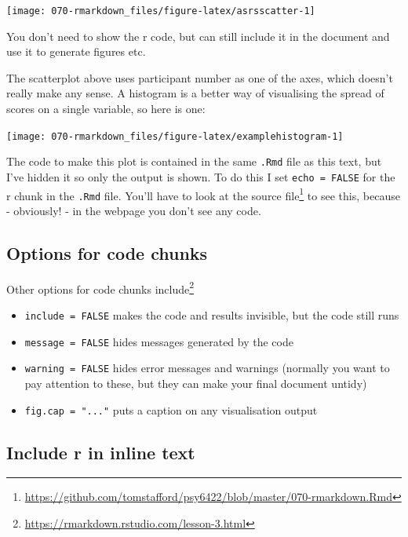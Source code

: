\documentclass[
  12pt,
  a5paper,
]{book}
\DeclareRobustCommand{\href}[2]{#2\footnote{\url{#1}}}
\providecommand{\tightlist}{%
  \setlength{\itemsep}{0pt}\setlength{\parskip}{0pt}}
\begin{document}
\begin{center}\texttt{[image: 070-rmarkdown\_files/figure-latex/asrsscatter-1]} \end{center}

You don't need to show the r code, but can still include it in the document and use it to generate figures etc.

The scatterplot above uses participant number as one of the axes, which doesn't really make any sense. A histogram is a better way of visualising the spread of scores on a single variable, so here is one:

\begin{center}\texttt{[image: 070-rmarkdown\_files/figure-latex/examplehistogram-1]} \end{center}

The code to make this plot is contained in the same \texttt{.Rmd} file as this text, but I've hidden it so only the output is shown. To do this I set \texttt{echo\ =\ FALSE} for the r chunk in the \texttt{.Rmd} file. You'll have to look at the \href{https://github.com/tomstafford/psy6422/blob/master/070-rmarkdown.Rmd}{source file} to see this, because - obviously! - in the webpage you don't see any code.

\hypertarget{options-for-code-chunks}{%
\subsection{Options for code chunks}\label{options-for-code-chunks}}

Other \href{https://rmarkdown.rstudio.com/lesson-3.html}{options for code chunks include}

\begin{itemize}
\tightlist
\item
  \texttt{include\ =\ FALSE} makes the code and results invisible, but the code still runs
\item
  \texttt{message\ =\ FALSE} hides messages generated by the code
\item
  \texttt{warning\ =\ FALSE} hides error messages and warnings (normally you want to pay attention to these, but they can make your final document untidy)
\item
  \texttt{fig.cap\ =\ "..."} puts a caption on any visualisation output
\end{itemize}

\hypertarget{include-r-in-inline-text}{%
\subsection{Include r in inline text}\label{include-r-in-inline-text}}
\end{document}
